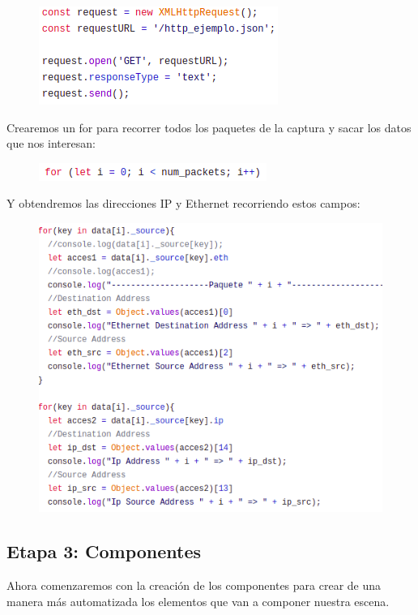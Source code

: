 \documentclass[a4paper, 12pt]{book}
\begin{document}
\begin{figure}[h]
\centering
    \includegraphics[scale=0.7]{img/GET.png}
\end{figure}

Crearemos un for para recorrer todos los paquetes de la captura y sacar los datos que nos interesan:

\begin{figure}[h]
\centering
    \includegraphics[scale=0.7]{img/for.png}
\end{figure}

Y obtendremos las direcciones IP y Ethernet recorriendo estos campos:

\begin{figure}[h]
\centering
    \includegraphics[scale=0.7]{img/datos_json.png}
\end{figure}

\newpage
\subsection{Etapa 3: Componentes}
Ahora comenzaremos con la creación de los componentes para crear de una manera más automatizada los elementos que van a componer nuestra escena.
\end{document}
